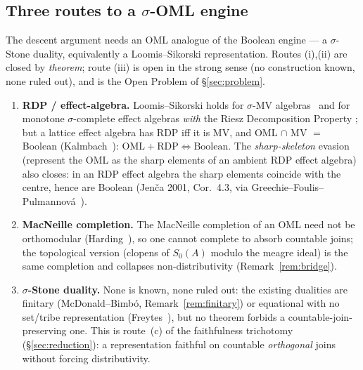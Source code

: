 \documentclass[11pt,reqno]{amsart}
\theoremstyle{plain}
\theoremstyle{definition}
\theoremstyle{remark}
\begin{document}
\subsection{Three routes to a $\sigma$-OML engine}
\label{sec:routes}
The descent argument needs an OML analogue of the Boolean engine --- a
$\sigma$-Stone duality, equivalently a Loomis--Sikorski representation. Routes
(i),(ii) are closed by \emph{theorem}; route (iii) is open in the strong sense (no
construction known, none ruled out), and is the Open Problem of \S\ref{sec:problem}.
\begin{enumerate}[label=(\roman*)]
  \item \textbf{RDP / effect-algebra.} Loomis--Sikorski holds for $\sigma$-MV
    algebras~\cite{Dvurecenskij2000} and for monotone $\sigma$-complete effect
    algebras \emph{with} the Riesz Decomposition Property
    \cite{Dvurecenskij2006}; but a lattice
    effect algebra has RDP iff it is MV, and OML $\cap$ MV $=$ Boolean
    (Kalmbach~\cite{Kalmbach1983}): $\text{OML}+\text{RDP}\iff\text{Boolean}$. The
    \emph{sharp-skeleton} evasion (represent the OML as the sharp elements of an
    ambient RDP effect algebra) also closes: in an RDP effect algebra the sharp
    elements coincide with the centre, hence are Boolean (Jen\v{c}a 2001, Cor.~4.3,
    via Greechie--Foulis--Pulmannov\'a~\cite{GreechieFoulisPulmannova1995}).
  \item \textbf{MacNeille completion.} The MacNeille completion of an OML need not
    be orthomodular (Harding~\cite{Harding1991}), so one cannot complete to absorb
    countable joins; the topological version (clopens of $S_0(A)$ modulo the meagre
    ideal) is the same completion and collapses non-distributivity
    (Remark~\ref{rem:bridge}).
  \item \textbf{$\sigma$-Stone duality.} None is known, none ruled out: the existing
    dualities are finitary (McDonald--Bimb\'{o}, Remark~\ref{rem:finitary}) or
    equational with no set/tribe representation (Freytes~\cite{Freytes2020}), but no
    theorem forbids a countable-join-preserving one. This is route~(c) of the
    faithfulness trichotomy (\S\ref{sec:reduction}): a representation faithful on
    countable \emph{orthogonal} joins without forcing distributivity.
\end{enumerate}
\end{document}
